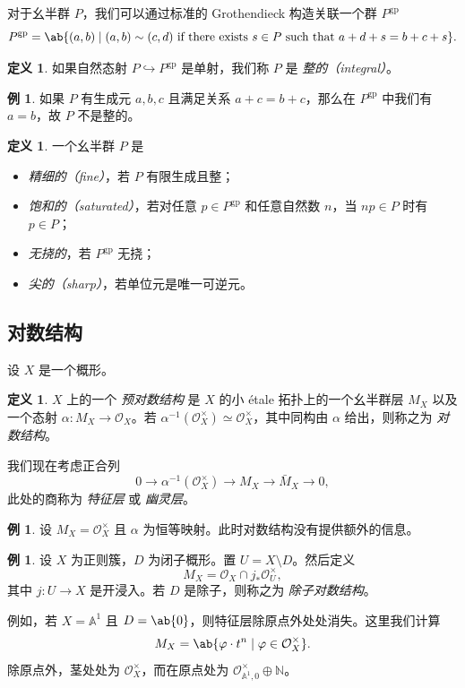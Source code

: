 \documentclass{amsart}
\theoremstyle{definition}
\newtheorem{defn}[thm]{定义}
\newtheorem{exm}[thm]{例}
\theoremstyle{remark}
\theoremstyle{plain}
\theoremstyle{definition}
\theoremstyle{remark}
\newcommand{\A}{\mathbb{A}}
\newcommand{\N}{\mathbb{N}}
\newcommand{\mc}[1]{\mathcal{#1}}
\newcommand{\mr}[1]{\mathrm{#1}}
\newcommand{\on}[1]{\operatorname{#1}}
\newcommand{\1}{\mathbf{1}}
\newcommand{\2}{\mathbf{2}}
\newcommand{\3}{\mathbf{3}}
\begin{document}
对于幺半群 \(P\)，我们可以通过标准的 Grothendieck 构造关联一个群 \(P^{\mr{gp}}\)
\[ P^{\mr{gp}} = \ab\{(a,b) \mid (a,b) \sim (c,d) \text{ if there exists } s \in P \text{ such that } a+d+s = b+c+s \}. \]
\begin{defn}
如果自然态射 \(P \hookrightarrow P^{\mr{gp}}\) 是单射，我们称 \(P\) 是 \textit{整的（integral）}。
\end{defn}

\begin{exm}
    如果 \(P\) 有生成元 \(a,b,c\) 且满足关系 \(a+c=b+c\)，那么在 \(P^{\on{gp}}\) 中我们有 \(a = b\)，故 \(P\) 不是整的。
\end{exm}

\begin{defn}
    一个幺半群 \(P\) 是
    \begin{itemize}
        \item \textit{精细的（fine）}，若 \(P\) 有限生成且整；
        \item \textit{饱和的（saturated）}，若对任意 \(p \in P^{\mr{gp}}\) 和任意自然数 \(n\)，当 \(np \in P\) 时有 \(p \in P\)；
        \item \textit{无挠的}，若 \(P^{\mr{gp}}\) 无挠；
        \item \textit{尖的（sharp）}，若单位元是唯一可逆元。
    \end{itemize}
\end{defn}

\subsection{对数结构}%
\label{sub:Log structures}

设 \(X\) 是一个概形。
\begin{defn}
    \(X\) 上的一个 \textit{预对数结构} 是 \(X\) 的小 \'etale 拓扑上的一个幺半群层 \(M_X\) 以及一个态射 \(\alpha \colon M_X \to \mc{O}_X\)。若 \(\alpha^{-1}(\mc{O}_X^{\times}) \simeq \mc{O}_X^{\times}\)，其中同构由 \(\alpha\) 给出，则称之为 \textit{对数结构}。
\end{defn}

我们现在考虑正合列
\[ 0 \to \alpha^{-1}(\mc{O}_X^{\times}) \to M_X \to \bar{M}_X \to 0, \]
此处的商称为 \textit{特征层} 或 \textit{幽灵层}。

\begin{exm}
    设 \(M_X = \mc{O}_X^{\times}\) 且 \(\alpha\) 为恒等映射。此时对数结构没有提供额外的信息。
\end{exm}

\begin{exm}
    设 \(X\) 为正则簇，\(D\) 为闭子概形。置 \(U = X \setminus D\)。然后定义
    \[ M_X = \mc{O}_X \cap j_* \mc{O}_U^{\times}, \]
    其中 \(j \colon U \to X\) 是开浸入。若 \(D\) 是除子，则称之为 \textit{除子对数结构}。

    例如，若 \(X = \A^1\) 且 \(D = \ab\{0\}\)，则特征层除原点外处处消失。这里我们计算
    \[ M_X = \ab\{ \varphi \cdot t^n \mid \varphi \in \mc{O}_X^{\times} \}. \]
    除原点外，茎处处为 \(\mc{O}_X^{\times}\)，而在原点处为 \(\mc{O}_{\A^1, 0}^{\times} \oplus \N\)。
\end{exm}
\end{document}
